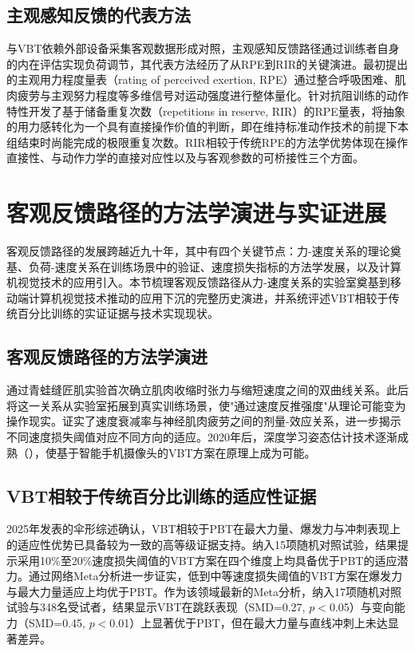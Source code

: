 \subsection{主观感知反馈的代表方法}

与VBT依赖外部设备采集客观数据形成对照，主观感知反馈路径通过训练者自身的内在评估实现负荷调节，其代表方法经历了从RPE到RIR的关键演进。\citep{Borg1982}最初提出的主观用力程度量表（rating of perceived exertion, RPE）通过整合呼吸困难、肌肉疲劳与主观努力程度等多维信号对运动强度进行整体量化。\citep{Zourdos2016}针对抗阻训练的动作特性开发了基于储备重复次数（repetitions in reserve, RIR）的RPE量表，将抽象的用力感转化为一个具有直接操作价值的判断，即在维持标准动作技术的前提下本组结束时尚能完成的极限重复次数。RIR相较于传统RPE的方法学优势体现在操作直接性、与动作力学的直接对应性以及与客观参数的可桥接性三个方面。

\section{客观反馈路径的方法学演进与实证进展}

客观反馈路径的发展跨越近九十年，其中有四个关键节点：力-速度关系的理论奠基、负荷-速度关系在训练场景中的验证、速度损失指标的方法学发展，以及计算机视觉技术的应用引入。本节梳理客观反馈路径从力-速度关系的实验室奠基到移动端计算机视觉技术推动的应用下沉的完整历史演进，并系统评述VBT相较于传统百分比训练的实证证据与技术实现现状。

\subsection{客观反馈路径的方法学演进}

\citep{Hill1938}通过青蛙缝匠肌实验首次确立肌肉收缩时张力与缩短速度之间的双曲线关系。此后\citep{GonzalezBadillo2010}将这一关系从实验室拓展到真实训练场景，使"通过速度反推强度"从理论可能变为操作现实。\citep{GonzalezBadillo2011}证实了速度衰减率与神经肌肉疲劳之间的剂量-效应关系，\citep{ParejaBlanco2017}进一步揭示不同速度损失阈值对应不同方向的适应。2020年后，深度学习姿态估计技术逐渐成熟（\citep{Bazarevsky2020}），使基于智能手机摄像头的VBT方案在原理上成为可能。

\subsection{VBT相较于传统百分比训练的适应性证据}

2025年发表的伞形综述确认，VBT相较于PBT在最大力量、爆发力与冲刺表现上的适应性优势已具备较为一致的高等级证据支持。\citep{Wlodarczyk2021}纳入15项随机对照试验，结果提示采用10\%至20\%速度损失阈值的VBT方案在四个维度上均具备优于PBT的适应潜力。\citep{Held2022}通过网络Meta分析进一步证实，低到中等速度损失阈值的VBT方案在爆发力与最大力量适应上均优于PBT。\citep{Luo2026}作为该领域最新的Meta分析，纳入17项随机对照试验与348名受试者，结果显示VBT在跳跃表现（SMD=0.27, $p$$<$0.05）与变向能力（SMD=0.45, $p$$<$0.01）上显著优于PBT，但在最大力量与直线冲刺上未达显著差异。

